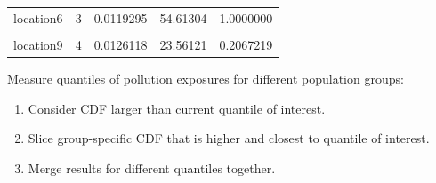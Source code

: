 \documentclass[
]{book}
\providecommand{\tightlist}{%
  \setlength{\itemsep}{0pt}\setlength{\parskip}{0pt}}
\begin{document}
\begin{table}[!h]
\begin{tabular}{l|l|r|r|r}
\hline
\cellcolor{gray!6}{location3} & \cellcolor{gray!6}{3} & \cellcolor{gray!6}{0.0138984} & \cellcolor{gray!6}{51.70466} & \cellcolor{gray!6}{0.8376617}\\
\hline
location6 & 3 & 0.0119295 & 54.61304 & 1.0000000\\
\hline
\cellcolor{gray!6}{location8} & \cellcolor{gray!6}{4} & \cellcolor{gray!6}{0.0183277} & \cellcolor{gray!6}{19.24456} & \cellcolor{gray!6}{0.1224562}\\
\hline
location9 & 4 & 0.0126118 & 23.56121 & 0.2067219\\
\hline
\end{tabular}
\end{table}

Measure quantiles of pollution exposures for different population groups:

\begin{enumerate}
\def\labelenumi{\arabic{enumi}.}
\tightlist
\item
  Consider CDF larger than current quantile of interest.
\item
  Slice group-specific CDF that is higher and closest to quantile of interest.
\item
  Merge results for different quantiles together.
\end{enumerate}
\end{document}
